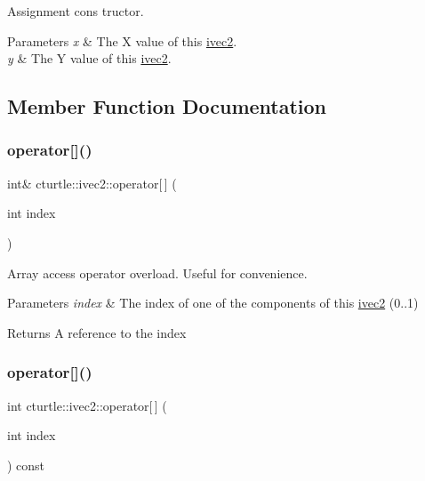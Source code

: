 Assignment cons tructor. 


\begin{DoxyParams}{Parameters}
{\em x} & The X value of this \hyperlink{structcturtle_1_1ivec2}{ivec2}. \\
\hline
{\em y} & The Y value of this \hyperlink{structcturtle_1_1ivec2}{ivec2}. \\
\hline
\end{DoxyParams}


\subsection{Member Function Documentation}
\mbox{\label{structcturtle_1_1ivec2_adc88a30605f0f71ea7844956a9473fd9}} 
\subsubsection{\texorpdfstring{operator[]()}{operator[]()}\hspace{0.1cm}{\footnotesize\ttfamily [1/2]}}
{\footnotesize\ttfamily int\& cturtle\+::ivec2\+::operator\mbox{[}$\,$\mbox{]} (\begin{DoxyParamCaption}\item[{int}]{index }\end{DoxyParamCaption})\hspace{0.3cm}{\ttfamily [inline]}}



Array access operator overload. Useful for convenience. 


\begin{DoxyParams}{Parameters}
{\em index} & The index of one of the components of this \hyperlink{structcturtle_1_1ivec2}{ivec2} (0..1) \\
\hline
\end{DoxyParams}
\begin{DoxyReturn}{Returns}
A reference to the index 
\end{DoxyReturn}
\mbox{\label{structcturtle_1_1ivec2_aad734cde7ca729a1148b0edd84637e25}} 
\subsubsection{\texorpdfstring{operator[]()}{operator[]()}\hspace{0.1cm}{\footnotesize\ttfamily [2/2]}}
{\footnotesize\ttfamily int cturtle\+::ivec2\+::operator\mbox{[}$\,$\mbox{]} (\begin{DoxyParamCaption}\item[{int}]{index }\end{DoxyParamCaption}) const\hspace{0.3cm}{\ttfamily [inline]}}



